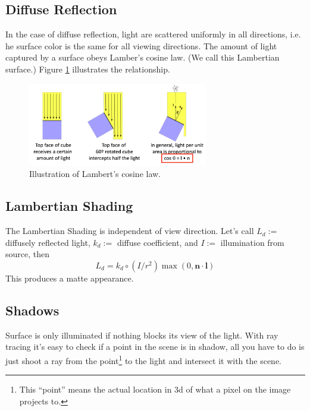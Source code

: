 \documentclass[11pt]{article}
\begin{document}
\subsection{Diffuse Reflection}
In the case of diffuse reflection, light are scattered uniformly in all directions, i.e. he surface color is the same for all viewing directions. The amount of light captured by a surface obeys Lamber's cosine law. (We call this Lambertian surface.) Figure \ref{lambert} illustrates the relationship. 

\begin{figure}
	\centering \includegraphics[width=0.7\textwidth]{figs/lambert}
	\caption{\label{lambert} Illustration of Lambert's cosine law. }
\end{figure}

\subsection{Lambertian Shading} 
The Lambertian Shading is independent of view direction. Let's call $L_d:=$ diffusely reflected light, $k_d:=$ diffuse coefficient, and $I:=$ illumination from source, then 
\begin{equation}
	L_{d}=k_{d}\circ \left(I / r^{2}\right) \max (0, \mathbf{n} \cdot \mathbf{l})
\end{equation}
This produces a matte appearance. 

\subsection{Shadows}
Surface is only illuminated if nothing blocks its view of the light. With ray tracing it's easy to check if a point in the scene is in shadow, all you have to do is just shoot a ray from the point\footnote{This ``point'' means the actual location in 3d of what a pixel on the image projects to. } to the light and intersect it with the scene.
\end{document}

